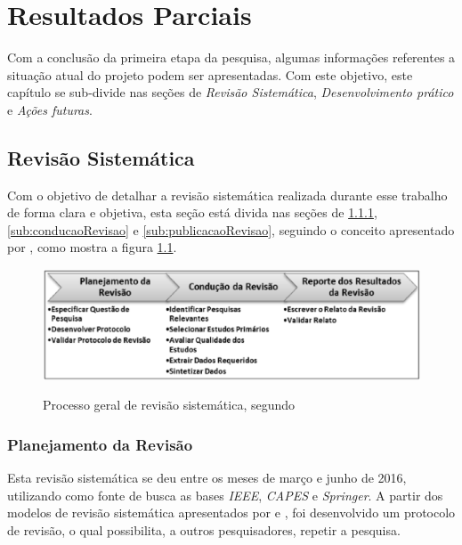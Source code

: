 \chapter[Resultados Parciais]{Resultados Parciais}
\label{sec:resultados_parciais}

Com a conclusão da primeira etapa da pesquisa, algumas informações referentes a situação atual do projeto podem ser apresentadas. Com este objetivo, este capítulo se sub-divide nas seções de \textit{Revisão Sistemática}, \textit{Desenvolvimento prático} e \textit{Ações futuras}.

\section{Revisão Sistemática} %
\label{sec:revisão_sistemática}

	Com o objetivo de detalhar a revisão sistemática realizada durante esse trabalho de forma clara e objetiva, esta seção está divida nas seções de \ref{sub:planejamentoRevisao}, \ref{sub:conducaoRevisao} e \ref{sub:publicacaoRevisao}, seguindo o conceito apresentado por \cite{Kitchenham}, como mostra a figura \ref{img:processoGeralRevisao}.

	\begin{figure}[H]
			\centering
			\caption{Processo geral de revisão sistemática, segundo \cite{Kitchenham}}
			\includegraphics[scale=0.7]{figuras/processoGeralRevisao.eps}
			\label{img:processoGeralRevisao}
		\end{figure}

	\subsection{Planejamento da Revisão} %
	\label{sub:planejamentoRevisao}

		Esta revisão sistemática se deu entre os meses de março e junho de 2016, utilizando como fonte de busca as bases \textit{IEEE}, \textit{CAPES} e \textit{Springer}. A partir dos modelos de revisão sistemática apresentados por \cite{Kitchenham} e \cite{exemploRevisaoSistematica}, foi desenvolvido um protocolo de revisão, o qual possibilita, a outros pesquisadores, repetir a pesquisa.

